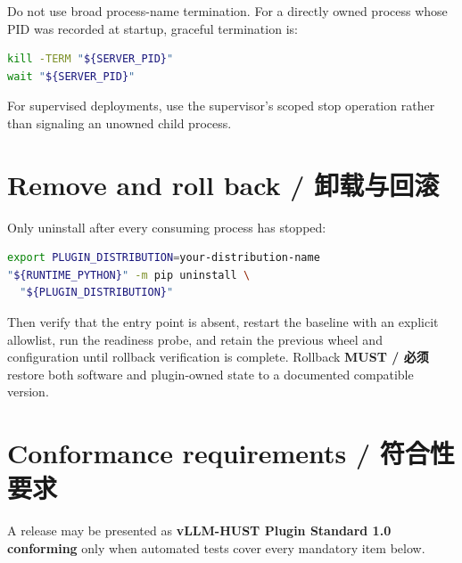 \documentclass[11pt,a4paper,fontset=none]{ctexart}
\newcommand{\must}{\textbf{MUST / 必须}}
\begin{document}
Do not use broad process-name termination. For a directly owned process whose PID was recorded at
startup, graceful termination is:

\begin{lstlisting}[language=bash]
kill -TERM "${SERVER_PID}"
wait "${SERVER_PID}"
\end{lstlisting}

For supervised deployments, use the supervisor's scoped stop operation rather than signaling an
unowned child process.

\section{Remove and roll back / 卸载与回滚}

Only uninstall after every consuming process has stopped:

\begin{lstlisting}[language=bash]
export PLUGIN_DISTRIBUTION=your-distribution-name
"${RUNTIME_PYTHON}" -m pip uninstall \
  "${PLUGIN_DISTRIBUTION}"
\end{lstlisting}

Then verify that the entry point is absent, restart the baseline with an explicit allowlist, run the
readiness probe, and retain the previous wheel and configuration until rollback verification is
complete. Rollback \must restore both software and plugin-owned state to a documented compatible
version.

\section{Conformance requirements / 符合性要求}

A release may be presented as \textbf{vLLM-HUST Plugin Standard 1.0 conforming} only when automated
tests cover every mandatory item below.
\end{document}
